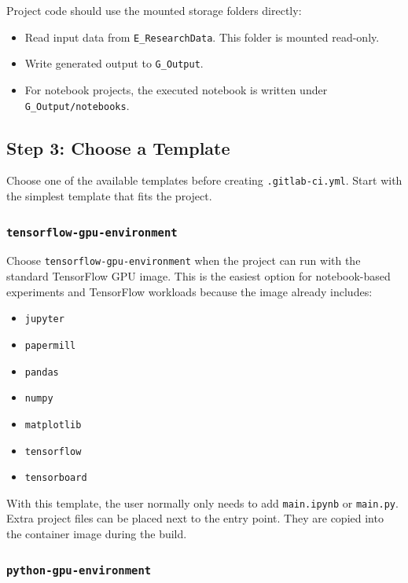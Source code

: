 \documentclass{article}
\begin{document}
\vspace{0.5cm}

Project code should use the mounted storage folders directly:

\begin{itemize}
	\item Read input data from \texttt{E\_ResearchData}. This folder is mounted read-only.
	\item Write generated output to \texttt{G\_Output}.
	\item For notebook projects, the executed notebook is written under \texttt{G\_Output/notebooks}.
\end{itemize}

\subsection{Step 3: Choose a Template}

Choose one of the available templates before creating \texttt{.gitlab-ci.yml}. Start with the simplest template that fits the project.

\subsubsection{\texttt{tensorflow-gpu-environment}}

Choose \texttt{tensorflow-gpu-environment} when the project can run with the standard TensorFlow GPU image. This is the easiest option for notebook-based experiments and TensorFlow workloads because the image already includes:

\begin{itemize}
	\item \texttt{jupyter}
	\item \texttt{papermill}
	\item \texttt{pandas}
	\item \texttt{numpy}
	\item \texttt{matplotlib}
	\item \texttt{tensorflow}
	\item \texttt{tensorboard}
\end{itemize}

With this template, the user normally only needs to add \texttt{main.ipynb} or \texttt{main.py}. Extra project files can be placed next to the entry point. They are copied into the container image during the build.

\subsubsection{\texttt{python-gpu-environment}}
\end{document}
